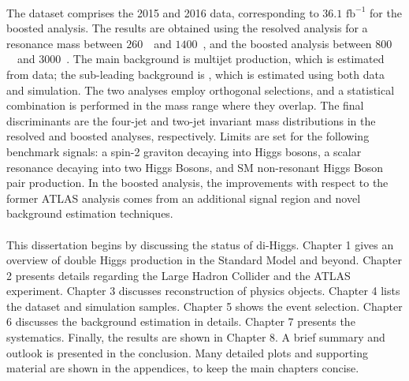 \paragraph{}
The dataset comprises the 2015 and 2016 data, corresponding to $36.1$ $\mathrm{fb}^{-1}$ for the boosted analysis. 
The results are obtained using the resolved analysis for a resonance mass between $260$~\GeV\ and $1400$~\GeV, and the boosted analysis between $800$~\GeV\ and $3000$~\GeV. 
The main background is multijet production, which is estimated from data; the sub-leading background is \ttbar, which is estimated using both data and simulation. 
The two analyses employ orthogonal selections, and a statistical combination is performed in the mass range where they overlap.
The final discriminants are the four-jet and two-jet invariant mass distributions in the resolved and boosted analyses, respectively. 
Limits are set for the following benchmark signals: a spin-2 graviton decaying into Higgs bosons, a scalar resonance decaying into two Higgs Bosons, and SM non-resonant Higgs Boson pair production.
In the boosted analysis, the improvements with respect to the former ATLAS analysis comes from an additional signal region and novel background estimation techniques. 

\paragraph{}
This dissertation begins by discussing the status of di-Higgs. 
Chapter 1 gives an overview of double Higgs production in the Standard Model and beyond. 
Chapter 2 presents details regarding the Large Hadron Collider and the ATLAS experiment. 
Chapter 3 discusses reconstruction of physics objects. 
Chapter 4 lists the dataset and simulation samples. 
Chapter 5 shows the event selection.
Chapter 6 discusses the background estimation in details.
Chapter 7 presents the systematics.
Finally, the results are shown in Chapter 8.
A brief summary and outlook is presented in the conclusion.
Many detailed plots and supporting material are shown in the appendices, to keep the main chapters concise.


